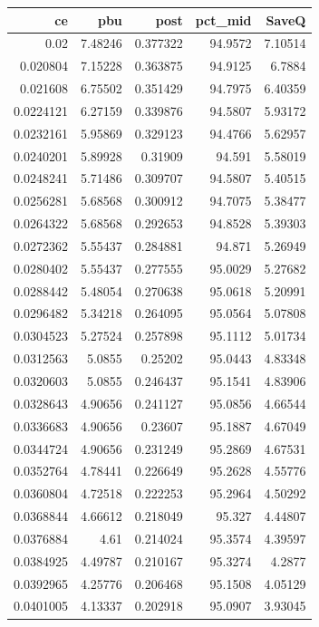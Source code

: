 \begin{tabular}{rrrrr}
\toprule
       ce &     pbu &      post &  pct\_mid &   SaveQ \\
\midrule
     0.02 & 7.48246 &  0.377322 &  94.9572 & 7.10514 \\
 0.020804 & 7.15228 &  0.363875 &  94.9125 &  6.7884 \\
 0.021608 & 6.75502 &  0.351429 &  94.7975 & 6.40359 \\
0.0224121 & 6.27159 &  0.339876 &  94.5807 & 5.93172 \\
0.0232161 & 5.95869 &  0.329123 &  94.4766 & 5.62957 \\
0.0240201 & 5.89928 &   0.31909 &   94.591 & 5.58019 \\
0.0248241 & 5.71486 &  0.309707 &  94.5807 & 5.40515 \\
0.0256281 & 5.68568 &  0.300912 &  94.7075 & 5.38477 \\
0.0264322 & 5.68568 &  0.292653 &  94.8528 & 5.39303 \\
0.0272362 & 5.55437 &  0.284881 &   94.871 & 5.26949 \\
0.0280402 & 5.55437 &  0.277555 &  95.0029 & 5.27682 \\
0.0288442 & 5.48054 &  0.270638 &  95.0618 & 5.20991 \\
0.0296482 & 5.34218 &  0.264095 &  95.0564 & 5.07808 \\
0.0304523 & 5.27524 &  0.257898 &  95.1112 & 5.01734 \\
0.0312563 &  5.0855 &   0.25202 &  95.0443 & 4.83348 \\
0.0320603 &  5.0855 &  0.246437 &  95.1541 & 4.83906 \\
0.0328643 & 4.90656 &  0.241127 &  95.0856 & 4.66544 \\
0.0336683 & 4.90656 &   0.23607 &  95.1887 & 4.67049 \\
0.0344724 & 4.90656 &  0.231249 &  95.2869 & 4.67531 \\
0.0352764 & 4.78441 &  0.226649 &  95.2628 & 4.55776 \\
0.0360804 & 4.72518 &  0.222253 &  95.2964 & 4.50292 \\
0.0368844 & 4.66612 &  0.218049 &   95.327 & 4.44807 \\
0.0376884 &    4.61 &  0.214024 &  95.3574 & 4.39597 \\
0.0384925 & 4.49787 &  0.210167 &  95.3274 &  4.2877 \\
0.0392965 & 4.25776 &  0.206468 &  95.1508 & 4.05129 \\
0.0401005 & 4.13337 &  0.202918 &  95.0907 & 3.93045 \\

\end{tabular}
